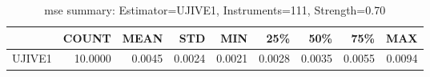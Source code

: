\begin{table}[ht]
\centering
\caption{mse summary: Estimator=UJIVE1, Instruments=111, Strength=0.70}
\begin{tabular}{lrrrrrrrr}
\toprule
 & COUNT & MEAN & STD & MIN & 25\% & 50\% & 75\% & MAX \\
\midrule
UJIVE1 & 10.0000 & 0.0045 & 0.0024 & 0.0021 & 0.0028 & 0.0035 & 0.0055 & 0.0094 \\
\bottomrule
\end{tabular}
\end{table}
